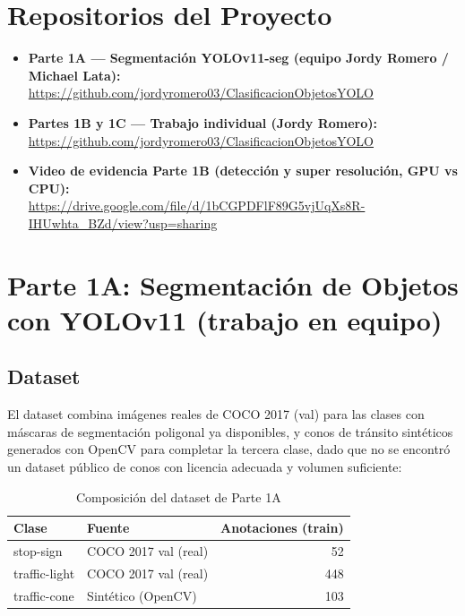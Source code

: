 \documentclass[12pt,a4paper]{article}
\let\oldsubsection\subsection
\renewcommand{\subsection}[1]{\needspace{5\baselineskip}\oldsubsection{#1}}
\begin{document}
\section*{Repositorios del Proyecto}

\begin{itemize}
  \item \textbf{Parte 1A — Segmentación YOLOv11-seg (equipo Jordy Romero / Michael Lata):}\\
        \url{https://github.com/jordyromero03/ClasificacionObjetosYOLO}

  \item \textbf{Partes 1B y 1C — Trabajo individual (Jordy Romero):}\\
        \url{https://github.com/jordyromero03/ClasificacionObjetosYOLO}

  \item \textbf{Video de evidencia Parte 1B (detección y super resolución, GPU vs CPU):}\\
        \url{https://drive.google.com/file/d/1bCGPDFlF89G5vjUqXs8R-IHUwhta_BZd/view?usp=sharing}
\end{itemize}

\section{Parte 1A: Segmentación de Objetos con YOLOv11 (trabajo en equipo)}

\subsection{Dataset}

El dataset combina imágenes reales de COCO 2017 (val) para las clases con máscaras de segmentación poligonal ya disponibles, y conos de tránsito sintéticos generados con OpenCV para completar la tercera clase, dado que no se encontró un dataset público de conos con licencia adecuada y volumen suficiente:

\begin{table}[htbp]
  \centering
  \caption{Composición del dataset de Parte 1A}
  \begin{tabular}{llr}
    \toprule
    \textbf{Clase} & \textbf{Fuente} & \textbf{Anotaciones (train)} \\
    \midrule
    stop-sign     & COCO 2017 val (real)      & 52  \\
    traffic-light & COCO 2017 val (real)      & 448 \\
    traffic-cone  & Sintético (OpenCV)        & 103 \\
    \bottomrule
  \end{tabular}
  \label{tab:dataset1a}
\end{table}
\end{document}
